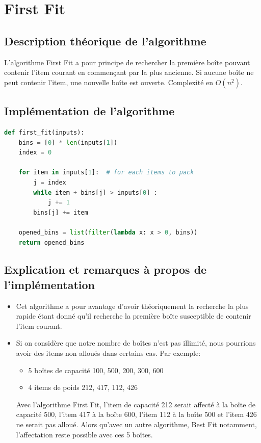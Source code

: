 \documentclass{article}
\begin{document}
\section{First Fit}
\subsection{Description théorique de l'algorithme}
L'algorithme First Fit a pour principe de rechercher la première boîte pouvant contenir l'item courant en commençant par la plus ancienne. Si aucune boîte ne peut contenir l'item, une nouvelle boîte est ouverte.
Complexité en $O(n^2)$.

\subsection{Implémentation de l'algorithme}
\begin{lstlisting}[language=Python, frame=single]
def first_fit(inputs):
    bins = [0] * len(inputs[1])
    index = 0
    
    for item in inputs[1]:  # for each items to pack
        j = index
        while item + bins[j] > inputs[0] :
            j += 1
        bins[j] += item
       
    opened_bins = list(filter(lambda x: x > 0, bins))
    return opened_bins
\end{lstlisting}

\subsection{Explication et remarques à propos de l'implémentation}
\begin{itemize}
  \item Cet algorithme a pour avantage d'avoir théoriquement la recherche la plus rapide étant donné qu'il recherche la première boîte susceptible de contenir l'item courant.
  \item Si on considère que notre nombre de boîtes n'est pas illimité, nous pourrions avoir des items non alloués dans certains cas. Par exemple:
  \begin{itemize}
  \item 5 boîtes de capacité 100, 500, 200, 300, 600
  \item 4 items de poids 212, 417, 112, 426
  \end{itemize}
  Avec l'algorithme First Fit, l'item de capacité 212 serait affecté à la boîte de capacité 500, l'item 417 à la boîte 600, l'item 112 à la boîte 500 et l'item 426 ne serait pas alloué. Alors qu'avec un autre algorithme, Best Fit notamment, l'affectation reste possible avec ces 5 boîtes.
\end{itemize}
\end{document}
